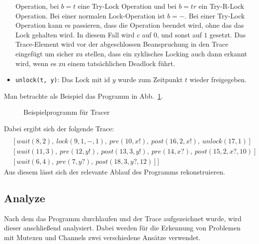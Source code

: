 \begin{itemize}
    Operation, bei $b = t$ eine Try-Lock Operation und bei $b = tr$ ein Try-R-Lock
    Operation. Bei einer normalen Lock-Operation ist $b = -$. Bei einer 
    Try-Lock Operation kann es passieren, dass die Operation beendet wird, 
    ohne das das Lock gehalten wird. In diesem Fall wird $c$ auf $0$, und 
    sonst auf $1$ gesetzt. Das Trace-Element wird vor der abgeschlossen 
    Beanspruchung in den Trace eingefügt um sicher zu stellen, dass 
    ein zyklisches Locking auch dann erkannt wird, wenn es zu einem 
    tatsächlichen Deadlock führt. 
  \item \texttt{unlock(t, y)}: Das Lock mit id $y$ wurde zum Zeitpunkt 
    $t$ wieder freigegeben. 
\end{itemize}


Man betrachte als Beispiel das Programm in Abb.~\ref{Chap:Tracer-Sec:Trace-Fig:Example}.\\
\begin{figure}[h]
  
  \caption{Beispielprogramm für Tracer}
  \label{Chap:Tracer-Sec:Trace-Fig:Example}
\end{figure}
Dabei ergibt sich der folgende Trace:
\begin{align*}
  [&[signal(1, 2),\ signal(2, 3),\ signal(3, 4),\ pre(4, a?, default),\ post(5, default)]\\
  &[wait(8, 2),\ lock(9, 1, -, 1),\ pre(10, x!),\ post(16, 2, x!),\ unlock(17, 1)]\\
  &[wait(11, 3),\ pre(12, y!),\ post(13, 3, y!),\ pre(14, x?),\ post(15, 2, x?, 10)]\\
  &[wait(6, 4),\ pre(7, y?),\ post(18, 3, y?, 12)]]
\end{align*}
Aus diesem lässt sich der relevante Ablauf des Programms rekonstruieren.

\subsection{Analyze}
Nach dem das Programm durchlaufen und der Trace aufgezeichnet wurde, 
wird dieser anschließend analysiert. Dabei werden für die Erkennung von 
Problemen mit Mutexen und Channels zwei verschiedene Ansätze verwendet.

